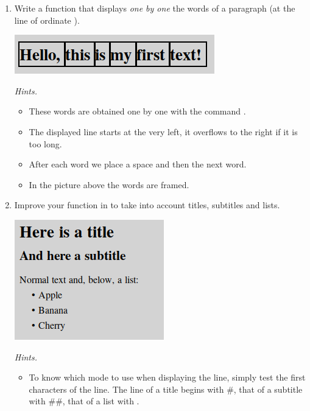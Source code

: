 \documentclass[11pt,class=report,crop=false]{standalone}
\begin{document}
\begin{activite}


\begin{enumerate}
  \item Write a function  that displays \emph{one by one} the words of a paragraph  (at the line of ordinate ). 
  
\begin{center}
\includegraphics[scale=0.6]{screen-markdown-3-en}
\end{center}   

  \emph{Hints.}
  \begin{itemize}
    \item These words are obtained one by one with the command .
    \item The displayed line starts at the very left, it overflows to the right if it is too long.
    \item After each word we place a space and then the next word.
    \item In the picture above the words are framed.
   \end{itemize}
   
 
  \item Improve your function in  to take into account titles, subtitles and lists.
  
   
\begin{center}
\includegraphics[scale=0.7]{screen-markdown-4-en}
\end{center}    
  
  \emph{Hints.}
    \begin{itemize}
    \item To know which mode to use when displaying the line, simply test the first characters of the line. The line of a title begins with \#, that of a subtitle with \#\#, that of a list with \ci{+}. 
    

\end{itemize}
\end{enumerate}
\end{activite}
\end{document}
